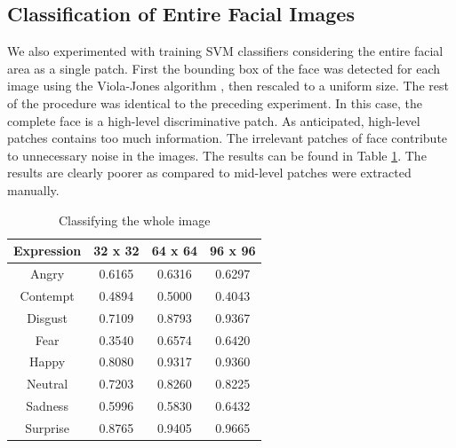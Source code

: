 \subsection{Classification of Entire Facial Images}\label{sec:experiments:face}
We also experimented with training SVM classifiers considering the entire facial area as a single patch. First the bounding box of the face was detected
for each image using the Viola-Jones algorithm \cite{Viola01}, then rescaled to a uniform size. %
The rest of the procedure was identical to the preceding experiment. In this case, the complete face is a high-level discriminative patch. As anticipated, high-level patches contains too much information. The irrelevant patches of face contribute to unnecessary noise in the images. The results can be found in Table \ref{table:entire_images}. The results are clearly poorer as compared to mid-level patches were extracted manually. 

\begin{table}
\begin{tabular}{| c | c | c | c |}
\hline
Expression & 32 x 32 &  64 x 64  & 96 x 96  \\

\hline
Angry	 & 0.6165 & 0.6316 & 0.6297	\\
Contempt & 0.4894 & 0.5000 & 0.4043	\\
Disgust	 & 0.7109 & 0.8793 & 0.9367	\\
Fear	 & 0.3540 & 0.6574 & 0.6420	\\
Happy	 & 0.8080 & 0.9317 & 0.9360	\\
Neutral	 & 0.7203 & 0.8260 & 0.8225	\\
Sadness	 & 0.5996 & 0.5830 & 0.6432	\\
Surprise & 0.8765 & 0.9405 & 0.9665	\\

\hline
\end{tabular}
\caption{Classifying the whole image}
\label{table:entire_images}
\end{table}



